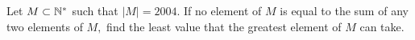 Let $M\subset \Bbb{N}^*$ such that $|M|=2004.$
If no element of $M$ is equal to the sum of any two elements of $M,$
find the least value that the greatest element of $M$ can take.